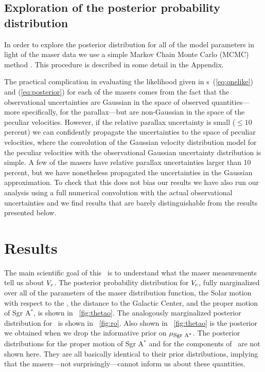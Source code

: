 \subsection{Exploration of the posterior probability distribution}

In order to explore the posterior distribution for all of the model
parameters in light of the maser data we use a simple Markov Chain
Monte Carlo (MCMC) method \citep{mackay}. This procedure is described
in some detail in the Appendix.

The practical complication in evaluating the likelihood given in
\eqnname s~(\ref{eq:onelike}) and (\ref{eq:posterior}) for each of the
masers comes from the fact that the observational uncertainties are
Gaussian in the space of observed quantities---more specifically, for
the parallax---but are non-Gaussian in the space of the peculiar
velocities. However, if the relative parallax uncertainty is small
($\leq 10$\,percent) we can confidently propagate the uncertainties to
the space of peculiar velocities, where the convolution of the
Gaussian velocity distribution model for the peculiar velocities with
the observational Gaussian uncertainty distribution is simple. A few
of the masers have relative parallax uncertainties larger than
10\,percent, but we have nonetheless propagated the uncertainties in
the Gaussian approximation. To check that this does not bias our
results we have also run our analysis using a full numerical
convolution with the actual observational uncertainties and we find
results that are barely distinguishable from the results presented
below.


\section{Results}\label{sec:results}

The main scientific goal of this \chaptername\ is to understand what
the maser measurements tell us about $V_c$. The posterior probability
distribution for $V_c$, fully marginalized over all of the parameters
of the maser distribution function, the Solar motion with respect to
the \lsr, the distance to the Galactic Center, and the proper motion
of Sgr A$^*$, is shown in \figurename~\ref{fig:thetao}. The
analogously marginalized posterior distribution for \Ro\ is shown in
\figurename~\ref{fig:ro}. Also shown in \figurename~\ref{fig:thetao}
is the posterior we obtained when we drop the informative prior on
$\mu_{\mbox{{\footnotesize Sgr A$^*$}}}$. The posterior distributions for the proper motion of Sgr
A$^*$ and for the components of \vsunlsr\ are not shown here. They are
all basically identical to their prior distributions, implying that
the masers---not surprisingly---cannot inform us about these
quantities.

